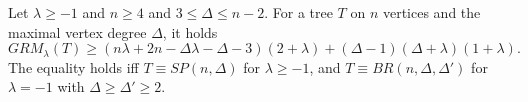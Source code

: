 \documentclass[preprint,12pt]{elsarticle}
\begin{document}
 

\begin{theorem}
Let $\lambda \geq -1$ and $n \geq 4$ and $3 \leq \Delta \leq n - 2$. For a tree $T$ on $n$ vertices and the maximal vertex degree $\Delta$, it holds
$$
GRM_{\lambda} (T) \geq
(n \lambda + 2 n - \Delta \lambda - \Delta - 3)(2 + \lambda) + (\Delta - 1)(\Delta + \lambda)(1 + \lambda).
$$
The equality holds iff $T \equiv SP(n, \Delta)$ for $\lambda \geq -1$, and $T \equiv BR(n, \Delta, \Delta')$ for $\lambda = -1$ with $\Delta \geq \Delta' \geq 2$.
\end{theorem}
\end{document}
